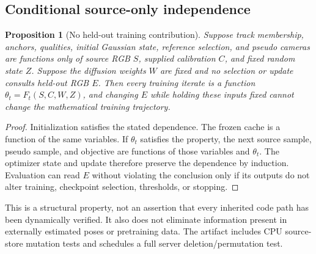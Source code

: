 \documentclass[10pt,twocolumn,letterpaper]{article}
\newtheorem{proposition}{Proposition}
\begin{document}
\subsection{Conditional source-only independence}
\begin{proposition}[No held-out training contribution]
Suppose track membership, anchors, qualities, initial Gaussian state, reference selection, and pseudo cameras are functions only of source RGB $S$, supplied calibration $C$, and fixed random state $Z$. Suppose the diffusion weights $W$ are fixed and no selection or update consults held-out RGB $E$. Then every training iterate is a function $\theta_t=F_t(S,C,W,Z)$, and changing $E$ while holding these inputs fixed cannot change the mathematical training trajectory.
\end{proposition}
\begin{proof}
Initialization satisfies the stated dependence. The frozen cache is a function of the same variables. If $\theta_t$ satisfies the property, the next source sample, pseudo sample, and objective are functions of those variables and $\theta_t$. The optimizer state and update therefore preserve the dependence by induction. Evaluation can read $E$ without violating the conclusion only if its outputs do not alter training, checkpoint selection, thresholds, or stopping.
\end{proof}
This is a structural property, not an assertion that every inherited code path has been dynamically verified. It also does not eliminate information present in externally estimated poses or pretraining data. The artifact includes CPU source-store mutation tests and schedules a full server deletion/permutation test.
\end{document}
